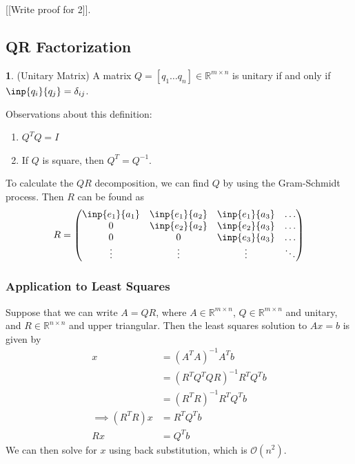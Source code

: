 \documentclass[12pt]{article}
\theoremstyle{definition}
\newtheorem{definition}{\color{NavyBlue}{\textbf{Definition}}}
\newcommand{\R}{\mathbb{R}}
\theoremstyle{definition}
\begin{document}
[[Write proof for 2]].

\subsection{QR Factorization}
\begin{definition}(Unitary Matrix)
A matrix $Q = [q_1 \ldots q_n] \in \R^{m\times n}$ is unitary if and only if $\inp{q_i}{q_j} = \delta_{ij}$.
\end{definition}

Observations about this definition:
\begin{enumerate}
	\item $Q^T Q = I$
	\item If $Q$ is square, then $Q^T = Q^{-1}$.
\end{enumerate}

To calculate the $QR$ decomposition, we can find $Q$ by using the Gram-Schmidt process. Then $R$ can be found as
\begin{equation}
	R = 
	\begin{pmatrix}
	\inp{e_1}{a_1} & \inp{e_1}{a_2} & \inp{e_1}{a_3} & \hdots \\
	0 & \inp{e_2}{a_2} & \inp{e_2}{a_3} & \hdots \\
	0 & 0 & \inp{e_3}{a_3} & \hdots \\
	\vdots & \vdots & \vdots & \ddots
	\end{pmatrix}
\end{equation}

\subsubsection{Application to Least Squares}
Suppose that we can write $A = QR$, where $A \in \R^{ m \times n}$, $Q \in \R^{ m \times n}$ and unitary, and $R \in \R^{n \times n}$ and upper triangular. Then the least squares solution to $Ax = b$ is given by
\begin{align*}
x &= (A^T A)^{-1} A^T b \\
&= (R^T Q^T Q R)^{-1} R^T Q^T b \\
&= (R^T R)^{-1} R^T Q^T b \\
\implies (R^T R) x &= R^T Q^T b \\
R x &= Q^T b \tag{assume $R$ is invertible (i.e. no zeros on the diagonal)}
\end{align*}
We can then solve for $x$ using back substitution, which is $\mathcal{O}(n^2)$.
\end{document}

